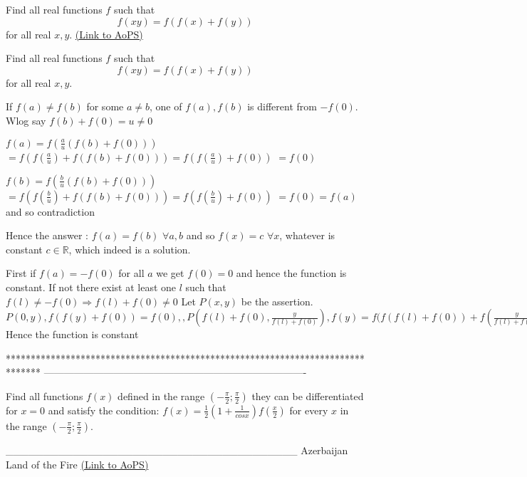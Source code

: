 \begin{problem}
	Find all real functions $f$ such that \[f(xy)=f(f(x)+f(y))\] for all real $x,y$.
	\flushright \href{https://artofproblemsolving.com/community/c6h536371}{(Link to AoPS)}
\end{problem}



\begin{solution}
	\begin{tcolorbox}Find all real functions $f$ such that \[f(xy)=f(f(x)+f(y))\] for all real $x,y$.\end{tcolorbox}
If $f(a)\ne f(b)$ for some $a\ne b$, one of $f(a),f(b)$ is different from $-f(0)$. Wlog say $f(b)+f(0)=u\ne 0$

$f(a)=f(\frac au(f(b)+f(0)))$ $=f(f(\frac au)+f(f(b)+f(0)))=f(f(\frac au)+f(0))$ $=f(0)$

$f(b)=f(\frac bu(f(b)+f(0)))$ $=f(f(\frac bu)+f(f(b)+f(0)))=f(f(\frac bu)+f(0))$ $=f(0)=f(a)$ and so contradiction

Hence the answer : $f(a)=f(b)$ $\forall a,b$ and so  $\boxed{f(x)=c}$ $\forall x$, whatever is constant $c\in\mathbb R$, which indeed is a solution.
\end{solution}



\begin{solution}
	First if $f(a)=-f(0)$ for all $a$ we get $f(0)=0$ and hence the function is constant.
If not there exist at least one $l$ such that $f(l)\neq -f(0) \Rightarrow f(l)+f(0) \neq 0$
Let $P(x,y)$ be the assertion.
$P(0,y) ,f(f(y)+f(0))=f(0),, P(f(l)+f(0),\frac{y}{f(l)+f(0)}) ,f(y)=f(f(f(l)+f(0))+f(\frac{y}{f(l)+f(0)})=f(f(0)+f(\frac{y}{f(l)+f(0)})=f(0)$ 
Hence the function is constant
\end{solution}
*******************************************************************************
-------------------------------------------------------------------------------

\begin{problem}
	Find all functions $f(x)$ defined in the range $(-\frac{\pi}{2};\frac{\pi}{2})$ they can be differentiated for $x=0$ and satisfy the condition:
$f(x)=\frac{1}{2}(1+\frac{1}{cosx})f(\frac{x}{2})$ for every $x$ in the range $(-\frac{\pi}{2};\frac{\pi}{2})$.


_______________________________________
Azerbaijan Land of the Fire 
	\flushright \href{https://artofproblemsolving.com/community/c6h536448}{(Link to AoPS)}
\end{problem}



